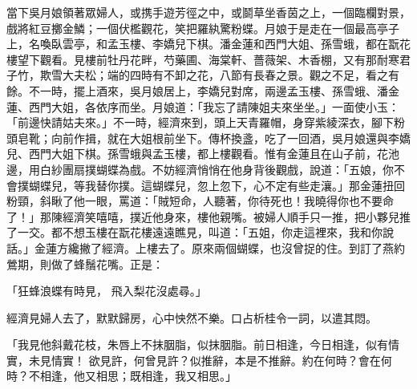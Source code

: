 \begin{showcontents}{}
當下吳月娘領著眾婦人，或携手遊芳徑之中，或鬬草坐香茵之上，一個臨欄對景，戲將紅豆擲金鱗；一個伏檻觀花，笑把羅紈驚粉蝶。月娘于是走在一個最高亭子上，名喚臥雲亭，和孟玉樓、李嬌兒下棋。潘金蓮和西門大姐、孫雪蛾，都在翫花樓望下觀看。見樓前牡丹花畔，芍藥圃、海棠軒、薔薇架、木香棚，又有那耐寒君子竹，欺雪大夫松；端的四時有不卸之花，八節有長春之景。觀之不足，看之有餘。不一時，擺上酒來，吳月娘居上，李嬌兒對席，兩邊孟玉樓、孫雪蛾、潘金蓮、西門大姐，各依序而坐。月娘道：「我忘了請陳姐夫來坐坐。」一面使小玉：「前邊快請姑夫來。」不一時，經濟來到，頭上天青羅帽，身穿紫綾深衣，腳下粉頭皂靴；向前作揖，就在大姐根前坐下。傳杯換盞，吃了一回酒，吳月娘還與李嬌兒、西門大姐下棋。孫雪蛾與孟玉樓，都上樓觀看。惟有金蓮且在山子前，花池邊，用白紗團扇撲蝴蝶為戲。不妨經濟悄悄在他身背後觀戲，說道：「五娘，你不會撲蝴蝶兒，等我替你撲。這蝴蝶兒，忽上忽下，心不定有些走瀼。」那金蓮扭回粉頸，斜瞅了他一眼，罵道：「賊短命，人聽著，你待死也！我曉得你也不要命了！」那陳經濟笑嘻嘻，撲近他身來，樓他親嘴。被婦人順手只一推，把小夥兒推了一交。都不想玉樓在翫花樓遠遠瞧見，叫道：「五姐，你走這裡來，我和你說話。」金蓮方纔撇了經濟。上樓去了。原來兩個蝴蝶，也沒曾捉的住。到訂了燕約鶯期，則做了蜂鬚花嘴。正是：

「狂蜂浪蝶有時見，  飛入梨花沒處尋。」

經濟見婦人去了，默默歸房，心中怏然不樂。口占析桂令一詞，以遣其悶。

「我見他斜戴花枝，朱唇上不抹胭脂，似抹胭脂。前日相逢，今日相逢，似有情實，未見情實！  欲見許，何曾見許？似推辭，本是不推辭。約在何時？會在何時？不相逢，他又相思；既相逢，我又相思。」


\end{showcontents}
